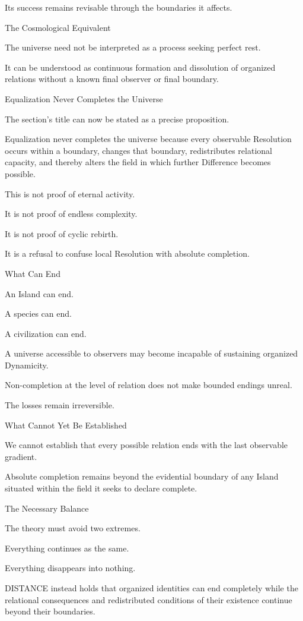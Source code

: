 Its success remains revisable through the boundaries it affects.

The Cosmological Equivalent

The universe need not be interpreted as a process seeking perfect rest.

It can be understood as continuous formation and dissolution of organized relations without a known final observer or final boundary.

Equalization Never Completes the Universe

The section’s title can now be stated as a precise proposition.

Equalization never completes the universe because every observable Resolution occurs within a boundary, changes that boundary, redistributes relational capacity, and thereby alters the field in which further Difference becomes possible.

This is not proof of eternal activity.

It is not proof of endless complexity.

It is not proof of cyclic rebirth.

It is a refusal to confuse local Resolution with absolute completion.

What Can End

An Island can end.

A species can end.

A civilization can end.

A universe accessible to observers may become incapable of sustaining organized Dynamicity.

Non-completion at the level of relation does not make bounded endings unreal.

The losses remain irreversible.

What Cannot Yet Be Established

We cannot establish that every possible relation ends with the last observable gradient.

Absolute completion remains beyond the evidential boundary of any Island situated within the field it seeks to declare complete.

The Necessary Balance

The theory must avoid two extremes.

Everything continues as the same.

Everything disappears into nothing.

DISTANCE instead holds that organized identities can end completely while the relational consequences and redistributed conditions of their existence continue beyond their boundaries.

